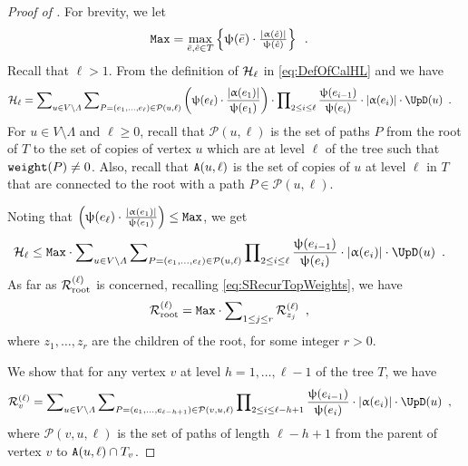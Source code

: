 \documentclass[11pt,reqno]{amsart}
\numberwithin{equation}{section}
\newcommand{\cP}{{\mathcal{P}}}
\newcommand{\applegreen}[1]{ {\color{applegreen}#1}}
\newcommand{\blue}[1]{{\color{blue}#1}}
\newcommand{\bostonuniversityred}[1]{{\color{bostonuniversityred}#1}}
\newcommand{\capri}[1]{{\color{capri}#1}}
\newcommand{\cadmiumgreen}[1]{{\color{cadmiumgreen}#1}}
\newcommand{\cadmiumorange}[1]{{\color{cadmiumorange}#1}}
\newcommand{\coquelicot}[1]{{\color{coquelicot}#1}}
\newcommand{\electricviolet}[1]{{\color{electricviolet}#1}}
\newcommand{\goldenbrown}[1]{{\color{goldenbrown}#1}}
\newcommand{\red}[1]{{\color{red}#1}}
\newcommand{\cp}{{\tt A}}
\newcommand{\abs}[1]{\blue{|}#1\blue{|}}
\renewcommand{\applegreen}[1]{#1}
\renewcommand{\blue}[1]{#1}
\renewcommand{\bostonuniversityred}[1]{#1}
\renewcommand{\capri}[1]{#1}
\renewcommand{\cadmiumgreen}[1]{#1}
\renewcommand{\cadmiumorange}[1]{#1}
\renewcommand{\coquelicot}[1]{#1}
\renewcommand{\electricviolet}[1]{#1}
\renewcommand{\goldenbrown}[1]{#1}
\renewcommand{\red}[1]{#1}
\newcommand{\ke}{\blue{e}}
\newcommand{\kh}{\cadmiumorange{h}}
\newcommand{\ki}{\capri{i}}
\newcommand{\kj}{\coquelicot{j}}
\newcommand{\kell}{{\color{green(pigment)}\ell}}%
\newcommand{\kP}{\goldenbrown{P}}
\newcommand{\kr}{\bostonuniversityred{r}}%
\newcommand{\ku}{\red{u}}
\newcommand{\kv}{\electricviolet{v}}
\newcommand{\kz}{\cadmiumgreen{z}}
\renewcommand{\ke}{e}
\renewcommand{\kh}{h}
\renewcommand{\ki}{i}
\renewcommand{\kj}{j}
\renewcommand{\kell}{\ell}
\renewcommand{\kP}{P}
\renewcommand{\kr}{r}
\renewcommand{\ku}{u}
\renewcommand{\kv}{v}
\renewcommand{\kz}{z}
\newcommand{\infweight}{\upalpha}
\begin{document}
\begin{proof}[Proof of ]
For brevity, we let 
\begin{align}\nonumber 
{\tt Max}& =\max_{\bar{\ke}, \hat{\ke} \in T}
\left\{ {\textstyle \chiofh(\bar{\ke}) \cdot \frac{\abs{\infweight(\hat{\ke})} }{\chiofh(\hat{\ke})}} \right\} \enspace.
\end{align}
Recall that $\kell>1$. From the definition of $\inflPotB_{\kell} $ in \eqref{eq:DefOfCalHL} and   %
we have 
\begin{align}
\inflPotB_{\kell} &=  \sum\nolimits_{\ku\in V\setminus \Lambda} \sum\nolimits_{\kP=(\ke_1,\ldots, \ke_\kell) \in \cP(\ku, \kell) }
 \left( \chiofh(\ke_{\kell})\cdot \frac{\abs{\infweight(\ke_1)} }{\chiofh(\ke_1)} \right)\cdot \prod\nolimits_{2\leq \ki\leq \kell}\frac{\chiofh(\ke_{\ki-1})}{\chiofh(\ke_{\ki})}\cdot \abs{\infweight(\ke_{\ki})} \cdot \UpD(\ku) \enspace.
 \nonumber
\end{align}
For $\ku\in V\setminus \Lambda$ and $\kell\geq 0$, recall that  $\cP(\ku,\kell)$ is the set of paths $\kP$ from the root of $T$ to 
the set of copies of  vertex $\ku$ which are at level  $\kell$ of the tree such that  ${\tt weight}(\kP)\neq 0$. Also,  recall that 
$\cp(\ku,\kell)$ is the set of copies of $\ku$ at level $\kell$ in $T$ that are connected to the root with a path $\kP\in \cP(\ku,\kell)$.


Noting that $\left( \chiofh(\ke_{\kell})\cdot \frac{\abs{\infweight(\ke_1)}}{\chiofh(\ke_1)} \right)\leq {\tt Max}$, we get 
\begin{align}
\inflPotB_{\kell} 
 &\leq   {\tt Max}\cdot \sum\nolimits_{\ku\in V\setminus \Lambda} \sum\nolimits_{\kP=(\ke_1,\ldots, \ke_\kell) \in \cP(\ku, \kell) } 
\prod\nolimits_{2\leq \ki\leq \kell}\frac{\chiofh(\ke_{\ki-1})}{\chiofh(\ke_{\ki})}\cdot \abs{\infweight(\ke_{\ki})}\cdot \UpD(\ku) \enspace. \label{eq:basis4HlAtHlVsRroot}
\end{align}
%
As far as $\subcont_{\rm root}$ is concerned, recalling \eqref{eq:SRecurTopWeights}, we have
\begin{align}\label{eq:SRecurTopWeightsRepeat4HlVsRroot}
\subcont_{\rm root} &= {\tt Max}\cdot \sum\nolimits_{1\leq \kj\leq\kr} \subcont_{\kz_{\kj}} \enspace,
\end{align}
where $\kz_1, \ldots, \kz_{\kr}$ are the children of the root, for some integer $\kr>0$. 



We show that for any vertex $\kv$ at level $\kh=1,\ldots, \kell-1$ of the tree $T$, we have
%
\begin{align}\label{eq:Target4InductionRvVsHl}
\subcont_{\kv} &=\sum\nolimits_{\ku\in V\setminus \Lambda} 
\sum\nolimits_{\kP=(\ke_1,\ldots, \ke_{\kell-\kh+1})\in \cP(\kv,\ku, \kell)} 
 \prod\nolimits_{2\leq \ki\leq \kell-\kh+1}
\frac{\chiofh(\ke_{\ki-1}) }{\chiofh(\ke_{\ki})} \cdot \abs{\infweight(\ke_{\ki})} \cdot \UpD(\ku) \enspace,
\end{align}
where $\cP(\kv,\ku, \kell)$ is the set of paths of length $\kell-\kh+1$ from the parent of vertex $\kv$ to 
$\cp(\ku,\kell)\cap T_{\kv}$.
 



\end{proof}
\end{document}
